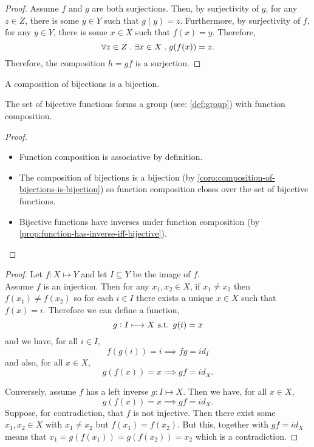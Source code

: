 \documentclass[../MathsNotesBase.tex]{subfiles}
\begin{document}
{\begin{proof}
			Assume $f$ and $g$ are both surjections. Then, by surjectivity of $g$, for any ${ z \in Z }$, there is some ${ y \in Y }$ such that ${ g(y) = z }$.
			Furthermore, by surjectivity of $f$, for any ${ y \in Y }$, there is some ${ x \in X }$ such that ${ f(x) = y }$. Therefore,
			\[ \forall z \in Z \;.\; \exists x \in X \;.\; g(f(x)) = z. \]
			Therefore, the composition $h = gf$ is a surjection.
		\end{proof}
		\begin{corollary}\label{coro:composition-of-bijections-is-bijection}
			A composition of bijections is a bijection.
		\end{corollary}
		\medskip
		\begin{corollary}
			The set of bijective functions forms a group (see: \ref{def:group}) with function composition.
		\end{corollary}
		\begin{proof}\nl
			\begin{itemize}
				\item Function composition is associative by definition.
				\item The composition of bijections is a bijection (by \autoref{coro:composition-of-bijections-is-bijection}) so function composition closes over the set of bijective functions.
				\item Bijective functions have inverses under function composition (by \autoref{prop:function-has-inverse-iff-bijective}).
			\end{itemize}
		\end{proof}
		
		\bigskip
		\begin{proof}
			Let ${ f: X \longmapsto Y }$ and let ${ I \subseteq Y }$ be the image of $f$.\\
			
			Assume $f$ is an injection. Then for any ${ x_1, x_2 \in X }$, if ${ x_1 \neq x_2 }$ then ${ f(x_1) \neq f(x_2) }$ so for each ${ i \in I }$ there exists a unique ${ x \in X }$ such that ${ f(x) = i }$. Therefore we can define a function,
			\[ g: I \longmapsto X \text{ s.t. } g(i) = x \]
			and we have, for all ${ i \in I }$,
			\[ f(g(i)) = i \implies fg = id_I \]
			and also, for all ${ x \in X }$,
			\[ g(f(x)) = x \implies gf = id_X. \]
			
			Conversely, assume $f$ has a left inverse ${ g: I \longmapsto X }$. Then we have, for all ${ x \in X }$,
			\[ g(f(x)) = x \implies gf = id_X. \]
			Suppose, for contradiction, that $f$ is not injective. Then there exist some ${ x_1, x_2 \in X }$ with ${ x_1 \neq x_2 }$ but ${ f(x_1) = f(x_2) }$. But this, together with ${ gf = id_X }$ means that ${ x_1 = g(f(x_1)) = g(f(x_2)) = x_2 }$ which is a contradiction.
		\end{proof}
	
}
\end{document}
